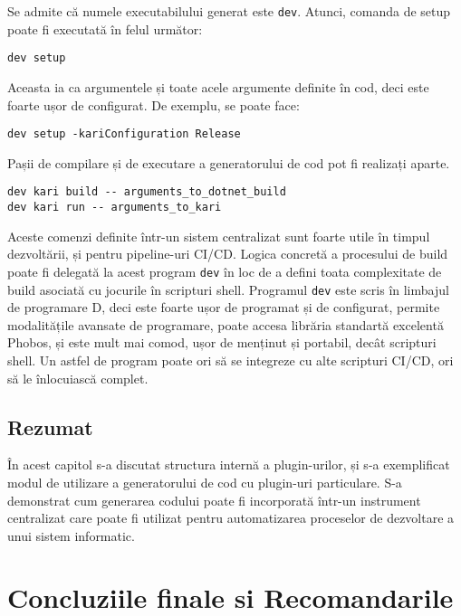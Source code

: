 \documentclass{report}
\begin{document}
Se admite că numele executabilului generat este \texttt{dev}.
Atunci, comanda de setup poate fi executată în felul următor:

\begin{verbatim}
dev setup
\end{verbatim}

Aceasta ia ca argumentele și toate acele argumente definite în cod, deci este foarte ușor de configurat.
De exemplu, se poate face:

\begin{verbatim}
dev setup -kariConfiguration Release
\end{verbatim}

Pașii de compilare și de executare a generatorului de cod pot fi realizați aparte.

\begin{verbatim}
dev kari build -- arguments_to_dotnet_build
dev kari run -- arguments_to_kari
\end{verbatim}

Aceste comenzi definite într-un sistem centralizat sunt foarte utile în timpul dezvoltării, și pentru pipeline-uri CI/CD.
Logica concretă a procesului de build poate fi delegată la acest program \texttt{dev} în loc de a defini toata complexitate de build asociată cu jocurile în scripturi shell.
Programul \texttt{dev} este scris în limbajul de programare D, deci este foarte ușor de programat și de configurat, permite modalitățile avansate de programare, poate accesa librăria standartă excelentă Phobos, și este mult mai comod, ușor de menținut și portabil, decât scripturi shell.
Un astfel de program poate ori să se integreze cu alte scripturi CI/CD, ori să le înlocuiască complet.

\section{Rezumat}

În acest capitol s-a discutat structura internă a plugin-urilor, și s-a exemplificat modul de utilizare a generatorului de cod cu plugin-uri particulare.
S-a demonstrat cum generarea codului poate fi incorporată într-un instrument centralizat care poate fi utilizat pentru automatizarea proceselor de dezvoltare a unui sistem informatic.

\chapter{Concluziile finale si Recomandarile}
\end{document}
